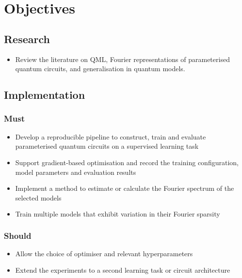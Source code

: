 
\section{Objectives}
\label{sec:Objectives}

\begin{flushleft} %
\large

\subsection*{Research}
\begin{itemize}
    \item Review the literature on QML, Fourier representations of parameterised quantum circuits, and generalisation in quantum models.
\end{itemize}

\subsection*{Implementation}
\subsubsection*{Must}
\begin{itemize}
    \item Develop a reproducible pipeline to construct, train and evaluate parameterised quantum circuits on a supervised learning task
    \item Support gradient-based optimisation and record the training configuration, model parameters and evaluation results
    \item Implement a method to estimate or calculate the Fourier spectrum of the selected models
    \item Train multiple models that exhibit variation in their Fourier sparsity
\end{itemize}

\subsubsection*{Should}
\begin{itemize}
    \item Allow the choice of optimiser and relevant hyperparameters
    \item Extend the experiments to a second learning task or circuit architecture
\end{itemize}


\end{flushleft}
